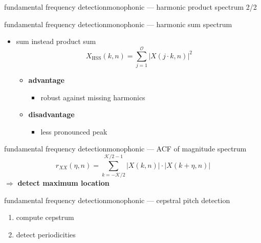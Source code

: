 	\begin{frame}{fundamental frequency detection}{monophonic --- harmonic product spectrum 2/2}
	\end{frame}
	
	\begin{frame}{fundamental frequency detection}{monophonic --- harmonic sum spectrum}
        \begin{itemize}
            \item   sum instead product sum
        \begin{equation*}\label{eq:hss}
            X_{\mathrm{HSS}}(k,n) = \sum\limits_{j=1}^{\mathcal{O}}{|X(j\cdot k,n)|^2} 
        \end{equation*}
        \bigskip

                \begin{itemize}
                    \item<2->   \textbf{advantage}
                        \begin{itemize}
                            \item   robust against missing harmonics
                        \end{itemize}
                    \item<3->   \textbf{disadvantage}
                        \begin{itemize}
                            \item   less pronounced peak
                        \end{itemize}
                \end{itemize}
        \end{itemize}
	\end{frame}
	
	\begin{frame}{fundamental frequency detection}{monophonic --- ACF of magnitude spectrum}
		\begin{equation*}
			r_{XX}(\eta,n) = \sum\limits_{k=-\mathcal{K}/2}^{\mathcal{K}/2-1}{|X(k,n)|\cdot |X(k+\eta,n)|}
		\end{equation*}
		\pause
		$\Rightarrow$ \textbf{detect maximum location}

	\end{frame}
	
	\begin{frame}{fundamental frequency detection}{monophonic --- cepstral pitch detection}
		\begin{enumerate}
			\item	compute cepstrum
			\item	detect periodicities
		\end{enumerate}
	\end{frame}
	
